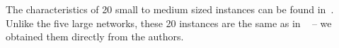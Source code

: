 \documentclass[dvipsnames,format=sigconf]{acmart} %
\begin{document}
\begin{comment}
    \begin{table}
 	\caption{Large-sized instance characteristics.}
 	\label{tab:big_instances_chars}  
 	\begin{tabular}{lrr}
 		City      & $|V|$ & $|E|$ \\ \hline
 		Belgrade      & 19,586 & 7,561,185  \\ 
 		Berlin        & 29,461 & 9,944,851 \\
 	    Boston        & 44,797 & 28,164,740 \\
 	    Dublin        & 37,982 & 21,630,466 \\
 	    Minsk         & 10,487 & 1,375,618 \\ \hline
 	\end{tabular}
 \end{table}
 
 
  \begin{table}
 	\caption{Small to medium sized instances characteristics.}
 	\label{tab:small_instances_chars}  
 	\begin{tabular}{lrr|lrr}
 		City      & $|V|$ & $|E|$ 			& City     & $|V|$ & $|E|$ \\ \hline
 		Bath&910&18560&Liverpool&1273&42564\\
 		Belfast&1700&62617&Manchester&1991&77286\\
 		Brighton&976&35012&Newcastle&1109&26614\\
 		Bristol&1569&47522&Nottingham&1739&51595\\
 		Cardiff&1127&23155&Oxford&479&8396\\
 		Coventry&1175&26689&Plymouth&1122&35070\\
 		Exeter&1250&31997&Sheffield&1582&50534\\
 		Glasgow&1137&24323&Southampton&796&19942\\
 		Leeds&1647&56511&Sunderland&1346&42013\\
 		Leicester&1531&48219&York&1044&23774\\
 		
 		\hline
 	\end{tabular}
 \end{table}
 
\end{comment}

 
 The characteristics of 20 small to medium sized instances can be found in~\cite{corcoran2021heuristics}.
 Unlike the five large networks, these 20 instances are the same as in ~\cite{corcoran2021heuristics} -- we obtained them directly from the authors.
\end{document}
